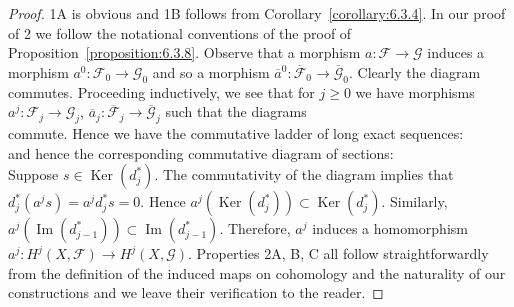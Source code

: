 \begin{proof}
1A is obvious and 1B follows from Corollary~\ref{corollary:6.3.4}. In our proof of 2 we follow the notational conventions of the proof of Proposition~\ref{proposition:6.3.8}. Observe that a morphism $a:\mathcal F\to\mathcal G$ induces a morphism $a^0:\mathcal F_0\to\mathcal G_0$ and so a morphism $\overline a^0:\overline{\mathcal F}_0\to\overline{\mathcal G}_0$. Clearly the diagram
\[

\]
commutes. Proceeding inductively, we see that for $j\geq0$ we have morphisms $a^j:\mathcal F_j\to\mathcal G_j$, $\overline a_j:\overline{\mathcal F}_j\to\overline{\mathcal G}_j$ such that the diagrams
\[

\]
commute. Hence we have the commutative ladder of long exact sequences:
\[

\]
and hence the corresponding commutative diagram of sections:
\[

\]
Suppose $s\in\operatorname{Ker}(d_j^*)$. The commutativity of the diagram implies that $d_j^*(a^js)=a^jd_j^*s=0$. Hence $a^j(\operatorname{Ker}(d_j^*))\subset\operatorname{Ker}(d_j^*)$. Similarly, $a^j(\operatorname{Im}(d_{j-1}^*))\subset\operatorname{Im}(d_{j-1}^*)$. Therefore, $a^j$ induces a homomorphism $a^j:H^j(X,\mathcal F)\to H^j(X,\mathcal G)$. Properties 2A, B, C all follow straightforwardly from the definition of the induced maps on cohomology and the naturality of our constructions and we leave their verification to the reader.


\end{proof}
